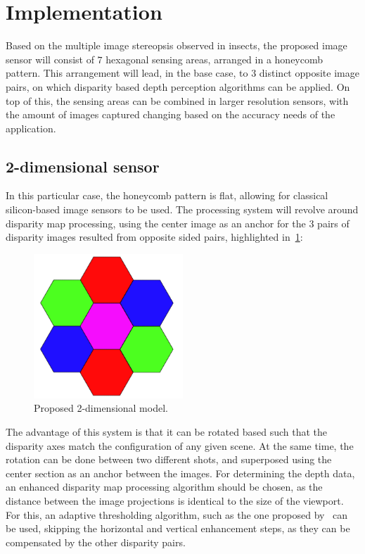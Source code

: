 \section{Implementation}

Based on the multiple image stereopsis observed in insects, the proposed image sensor will consist
of \(7\) hexagonal sensing areas, arranged in a honeycomb pattern. This arrangement will lead, in
the base case, to \(3\) distinct opposite image pairs, on which disparity based depth perception 
algorithms can be applied. On top of this, the sensing areas can be combined in larger resolution
sensors, with the amount of images captured changing based on the accuracy needs of the application.

\subsection*{2-dimensional sensor}

In this particular case, the honeycomb pattern is flat, allowing for classical silicon-based image
sensors to be used. The processing system will revolve around disparity map processing, using the 
center image as an anchor for the \(3\) pairs of disparity images resulted from opposite sided pairs,
highlighted in~\ref{fig2DModel}:

\begin{figure}[h]
    \includegraphics[width=0.50\textwidth, height=0.50\textwidth]{resources/png/2d_model.png}
    \caption{Proposed 2-dimensional model.~\label{fig2DModel}}
\end{figure}

The advantage of this system is that it can be rotated based such that the disparity axes match the 
configuration of any given scene. At the same time, the rotation can be done between two different
shots, and superposed using the center section as an anchor between the images. For determining
the depth data, an enhanced disparity map processing algorithm should be chosen, as the distance between
the image projections is identical to the size of the viewport. For this, an adaptive thresholding
algorithm, such as the one proposed by~\cite{withMain} can be used, skipping the horizontal and 
vertical enhancement steps, as they can be compensated by the other disparity pairs.

